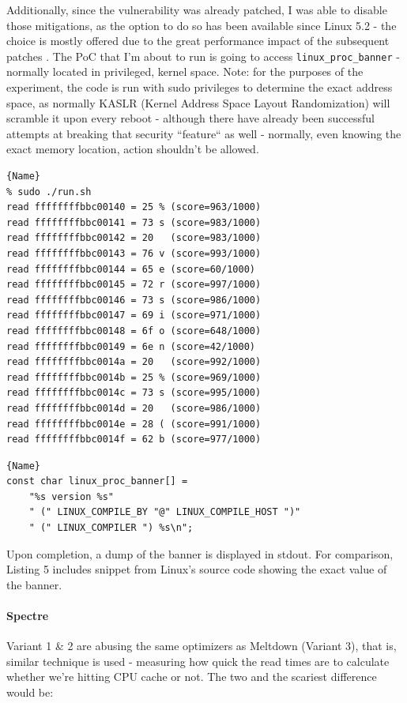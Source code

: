 \documentclass{article}
\begin{document}
Additionally, since the vulnerability was already patched, I was able to disable those mitigations, as the option to do so has been available since Linux 5.2 - the choice is mostly offered due to the great performance impact of the subsequent patches \cite{low2018overview}. The PoC that I'm about to run is going to access \lstinline{linux_proc_banner} - normally located in privileged, kernel space. Note: for the purposes of the experiment, the code is run with sudo privileges to determine the exact address space, as normally KASLR (Kernel Address Space Layout Randomization) will scramble it upon every reboot - although there have already been successful attempts at breaking that security ``feature`` as well \cite{jang2016breaking} - normally, even knowing the exact memory location, action shouldn't be allowed. 

\pagebreak

\begin{lstlisting}[caption=Meltdown in action, frame=tlrb, breaklines=true]{Name}
% sudo ./run.sh          
read ffffffffbbc00140 = 25 % (score=963/1000)
read ffffffffbbc00141 = 73 s (score=983/1000)
read ffffffffbbc00142 = 20   (score=983/1000)
read ffffffffbbc00143 = 76 v (score=993/1000)
read ffffffffbbc00144 = 65 e (score=60/1000)
read ffffffffbbc00145 = 72 r (score=997/1000)
read ffffffffbbc00146 = 73 s (score=986/1000)
read ffffffffbbc00147 = 69 i (score=971/1000)
read ffffffffbbc00148 = 6f o (score=648/1000)
read ffffffffbbc00149 = 6e n (score=42/1000)
read ffffffffbbc0014a = 20   (score=992/1000)
read ffffffffbbc0014b = 25 % (score=969/1000)
read ffffffffbbc0014c = 73 s (score=995/1000)
read ffffffffbbc0014d = 20   (score=986/1000)
read ffffffffbbc0014e = 28 ( (score=991/1000)
read ffffffffbbc0014f = 62 b (score=977/1000)
\end{lstlisting}


\begin{lstlisting}[caption=init/version.c from Linux kernel source code, frame=tlrb, breaklines=true]{Name}
const char linux_proc_banner[] =
	"%s version %s"
	" (" LINUX_COMPILE_BY "@" LINUX_COMPILE_HOST ")"
	" (" LINUX_COMPILER ") %s\n";
\end{lstlisting}

Upon completion, a dump of the banner is displayed in stdout. For comparison, Listing 5 includes snippet from Linux's source code \cite{linuxsrc} showing the exact value of the banner. 

\paragraph{Spectre}
Variant 1 \& 2 are abusing the same optimizers as Meltdown (Variant 3), that is, similar technique is used - measuring how quick the read times are to calculate whether we're hitting CPU cache or not. The two and the scariest difference would be:
\end{document}
